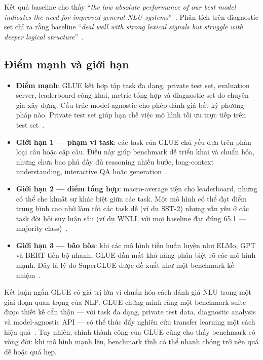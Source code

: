 Kết quả baseline cho thấy ``\textit{the low absolute performance of our best model indicates the need for improved general NLU systems}''~\cite{glue}. Phân tích trên diagnostic set chỉ ra rằng baseline ``\textit{deal well with strong lexical signals but struggle with deeper logical structure}''~\cite{glue}.

\subsection{Điểm mạnh và giới hạn}

\begin{itemize}
    \item \textbf{Điểm mạnh}: GLUE kết hợp tập task đa dạng, private test set, evaluation server, leaderboard công khai, metric tổng hợp và diagnostic set do chuyên gia xây dựng. Cấu trúc model-agnostic cho phép đánh giá bất kỳ phương pháp nào. Private test set giúp hạn chế việc mô hình tối ưu trực tiếp trên test set~\cite{glue}.

    \item \textbf{Giới hạn 1 --- phạm vi task}: các task của GLUE chủ yếu dựa trên phân loại câu hoặc cặp câu. Điều này giúp benchmark dễ triển khai và chuẩn hóa, nhưng chưa bao phủ đầy đủ reasoning nhiều bước, long-context understanding, interactive QA hoặc generation~\cite{glue}.

    \item \textbf{Giới hạn 2 --- điểm tổng hợp}: macro-average tiện cho leaderboard, nhưng có thể che khuất sự khác biệt giữa các task. Một mô hình có thể đạt điểm trung bình cao nhờ làm tốt các task dễ (ví dụ SST-2) nhưng vẫn yếu ở các task đòi hỏi suy luận sâu (ví dụ WNLI, với mọi baseline đạt đúng 65.1 --- majority class)~\cite{glue}.

    \item \textbf{Giới hạn 3 --- bão hòa}: khi các mô hình tiền huấn luyện như ELMo, GPT và BERT tiến bộ nhanh, GLUE dần mất khả năng phân biệt rõ các mô hình mạnh. Đây là lý do SuperGLUE được đề xuất như một benchmark kế nhiệm~\cite{superglue}.
\end{itemize}

\begin{summarybox}{Kết luận ngắn}
GLUE có giá trị lớn vì chuẩn hóa cách đánh giá NLU trong một giai đoạn quan trọng của NLP. GLUE chứng minh rằng một benchmark suite được thiết kế cẩn thận --- với task đa dạng, private test data, diagnostic analysis và model-agnostic API --- có thể thúc đẩy nghiên cứu transfer learning một cách hiệu quả~\cite{glue}. Tuy nhiên, chính thành công của GLUE cũng cho thấy benchmark có vòng đời: khi mô hình mạnh lên, benchmark tĩnh có thể nhanh chóng trở nên quá dễ hoặc quá hẹp.
\end{summarybox}
